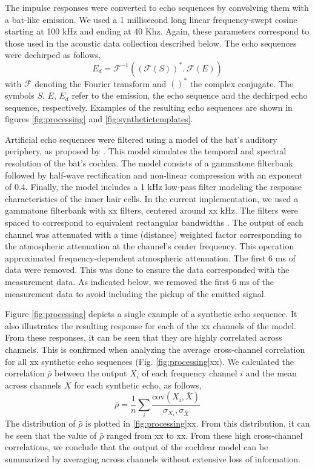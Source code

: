 \documentclass[preprint,5p]{elsarticle}
\begin{document}
The impulse responses were converted to echo sequences by convolving them with a bat-like emission. We used a 1 millisecond long linear frequency-swept cosine starting at 100 kHz and ending at 40 Khz. Again, these parameters correspond to those used in the acoustic data collection described below. The echo sequences were dechirped as follows, 
%
%
\begin{equation}\label{key}
E_d = \mathcal{F}^{-1}((\mathcal{F}(S))^* . \ \mathcal{F}(E))
\end{equation}
with $\mathcal{F}$ denoting the Fourier transform and $()^*$ the complex conjugate. The symbols $S$, $E$, $E_d$ refer to the emission, the echo sequence and the dechirped echo sequence, respectively. Examples of the resulting echo sequences are shown in figures \ref{fig:processing} and \ref{fig:synthetictemplates}. 

Artificial echo sequences were filtered using a model of the bat's auditory periphery, as proposed by \citet{Wiegrebe2008}. This model simulates the temporal and spectral resolution of the bat's cochlea. The model consists of a gammatone filterbank followed by half-wave rectification and non-linear compression with an exponent of 0.4. Finally, the model includes a 1 kHz low-pass filter modeling the response characteristics of the inner hair cells. In the current implementation, we used a gammatone filterbank with xx filters, centered around xx kHz. The filters were spaced to correspond to equivalent rectangular bandwidths \citep{Glasberg1990}. The output of each channel was attenuated with a time (distance) weighted factor corresponding to the atmospheric attenuation at the channel's center frequency. This operation approximated frequency-dependent atmospheric attenuation. The first 6 ms of data were removed. This was done to ensure the data corresponded with the measurement data. As indicated below, we removed the first 6 ms of the measurement  data to avoid including the pickup of the emitted signal. 

Figure \ref{fig:processing} depicts a single example of a synthetic echo sequence. It also illustrates the resulting response for each of the xx channels of the \citet{Wiegrebe2008} model. From these responses, it can be seen that they are highly correlated across channels. This is confirmed when analyzing the average cross-channel correlation for all xx synthetic echo sequences (Fig. \ref{fig:processing}xx). We calculated the correlation $\bar{\rho}$ between the output $X_i$ of each frequency channel $i$ and the mean across channels $\bar{X}$ for each synthetic echo, as follows,
%
\begin{equation}
\bar{\rho} = \frac{1}{n} \sum_i \frac{\mbox{cov}(X_i,\bar{X})}{\sigma_{X_i}, \sigma_{\bar{X}}} 
\end{equation}
%
The distribution of $\bar{\rho}$ is plotted in \ref{fig:processing}xx. From this distribution, it can be seen that the value of $\bar{\rho}$ ranged from xx to xx. From these high cross-channel correlations, we conclude that the output of the cochlear model can be summarized by averaging across channels without extensive loss of information. 
\end{document}
